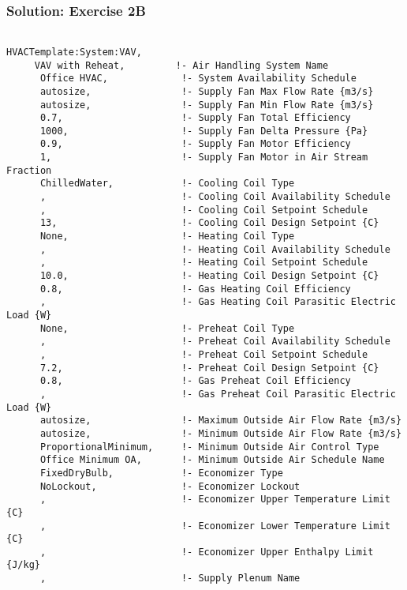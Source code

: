 \subsubsection{Solution: Exercise 2B}\label{solution-exercise-2b}

\begin{lstlisting}

HVACTemplate:System:VAV,
     VAV with Reheat,         !- Air Handling System Name
      Office HVAC,             !- System Availability Schedule
      autosize,                !- Supply Fan Max Flow Rate {m3/s}
      autosize,                !- Supply Fan Min Flow Rate {m3/s}
      0.7,                     !- Supply Fan Total Efficiency
      1000,                    !- Supply Fan Delta Pressure {Pa}
      0.9,                     !- Supply Fan Motor Efficiency
      1,                       !- Supply Fan Motor in Air Stream Fraction
      ChilledWater,            !- Cooling Coil Type
      ,                        !- Cooling Coil Availability Schedule
      ,                        !- Cooling Coil Setpoint Schedule
      13,                      !- Cooling Coil Design Setpoint {C}
      None,                    !- Heating Coil Type
      ,                        !- Heating Coil Availability Schedule
      ,                        !- Heating Coil Setpoint Schedule
      10.0,                    !- Heating Coil Design Setpoint {C}
      0.8,                     !- Gas Heating Coil Efficiency
      ,                        !- Gas Heating Coil Parasitic Electric Load {W}
      None,                    !- Preheat Coil Type
      ,                        !- Preheat Coil Availability Schedule
      ,                        !- Preheat Coil Setpoint Schedule
      7.2,                     !- Preheat Coil Design Setpoint {C}
      0.8,                     !- Gas Preheat Coil Efficiency
      ,                        !- Gas Preheat Coil Parasitic Electric Load {W}
      autosize,                !- Maximum Outside Air Flow Rate {m3/s}
      autosize,                !- Minimum Outside Air Flow Rate {m3/s}
      ProportionalMinimum,     !- Minimum Outside Air Control Type
      Office Minimum OA,       !- Minimum Outside Air Schedule Name
      FixedDryBulb,            !- Economizer Type
      NoLockout,               !- Economizer Lockout
      ,                        !- Economizer Upper Temperature Limit {C}
      ,                        !- Economizer Lower Temperature Limit {C}
      ,                        !- Economizer Upper Enthalpy Limit {J/kg}
      ,                        !- Supply Plenum Name

\end{lstlisting}
